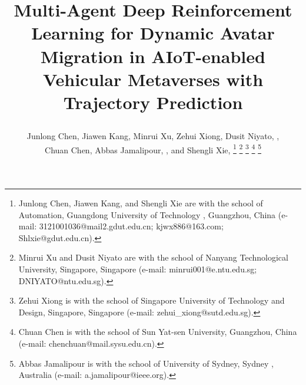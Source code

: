 \documentclass[lettersize,journal]{IEEEtran}
\begin{document}
\title{Multi-Agent Deep Reinforcement Learning for Dynamic Avatar Migration in AIoT-enabled Vehicular Metaverses with Trajectory Prediction


}


\author{Junlong Chen, Jiawen Kang, Minrui Xu, Zehui Xiong, Dusit Niyato, , \\Chuan Chen, Abbas Jamalipour, , and Shengli Xie, 
\thanks{Junlong Chen, Jiawen Kang, and Shengli Xie are with the school of Automation, Guangdong University of Technology
, Guangzhou, China (e-mail: 3121001036@mail2.gdut.edu.cn; kjwx886@163.com; Shlxie@gdut.edu.cn).}%
\thanks{Minrui Xu and Dusit Niyato are with the school of Nanyang Technological University, Singapore, Singapore (e-mail: minrui001@e.ntu.edu.sg; DNIYATO@ntu.edu.sg).}%
\thanks{Zehui Xiong is with the school of Singapore University of Technology and Design, Singapore, Singapore (e-mail: zehui\_xiong@sutd.edu.sg).}%
\thanks{Chuan Chen is with the school of Sun Yat-sen University, Guangzhou, China (e-mail: chenchuan@mail.sysu.edu.cn).}%
\thanks{Abbas Jamalipour is with the school of University of Sydney, Sydney
, Australia (e-mail: a.jamalipour@ieee.org).}}%



\maketitle
\end{document}
